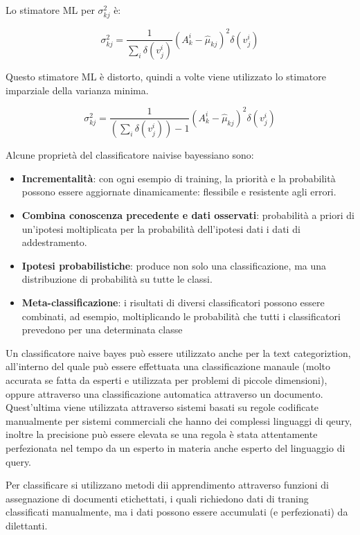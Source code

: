 \documentclass[a4paper]{extarticle}
\begin{document}
Lo stimatore ML per $\sigma_{kj}^2$ è:

\begin{equation*}
\sigma_{kj}^2 = \dfrac{1}{\sum\limits_i \delta(v_j^i)} (A_k^i - \hat \mu_{kj})^2 \delta(v_j^i)
\end{equation*}

Questo stimatore ML è distorto, quindi a volte viene utilizzato lo stimatore imparziale della varianza minima.

\begin{equation*}
\sigma_{kj}^2 = \dfrac{1}{(\sum\limits_i \delta(v_j^i))-1} (A_k^i - \hat \mu_{kj})^2 \delta(v_j^i)
\end{equation*}

Alcune proprietà del classificatore naivise bayessiano sono:
\begin{itemize}
\item \textbf{Incrementalità}: con ogni esempio di training, la priorità e la probabilità possono essere aggiornate dinamicamente: flessibile e resistente agli errori.
\item \textbf{Combina conoscenza precedente e dati osservati}: probabilità a priori di un'ipotesi moltiplicata per la probabilità dell'ipotesi dati i dati di addestramento.
\item \textbf{Ipotesi probabilistiche}: produce non solo una classificazione, ma una distribuzione di probabilità su tutte le classi.
\item \textbf{Meta-classificazione}: i risultati di diversi classificatori possono essere combinati, ad esempio, moltiplicando le probabilità che tutti i classificatori prevedono per una determinata classe
\end{itemize}

Un classificatore naive bayes può essere utilizzato anche per la text categoriztion, all'interno del quale può essere effettuata una classificazione manaule (molto accurata se fatta da esperti e utilizzata per problemi di piccole dimensioni), oppure attraverso una classificazione automatica attraverso un documento. Quest'ultima viene utilizzata attraverso sistemi basati su regole codificate manualmente per sistemi commerciali che hanno dei complessi linguaggi di qeury, inoltre la precisione può essere elevata se una regola è stata attentamente perfezionata nel tempo da un esperto in materia anche esperto del linguaggio di query.

Per classificare si utilizzano metodi dii apprendimento attraverso funzioni di assegnazione di documenti etichettati, i quali richiedono dati di traning classificati manualmente, ma i dati possono essere accumulati (e perfezionati) da dilettanti.
\end{document}
